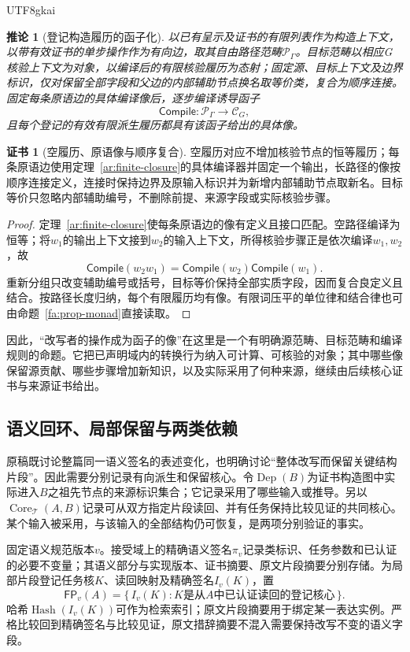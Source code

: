 \documentclass[11pt,a4paper]{article}
\theoremstyle{plain}
\newtheorem{corollary}[theorem]{推论}
\theoremstyle{definition}
\newtheorem*{certificate}{证书}
\theoremstyle{remark}
\begin{document}
\begin{CJK*}{UTF8}{gkai}
\begin{corollary}[登记构造履历的函子化]
\label{ar:functor}
以已有呈示及证书的有限列表作为构造上下文，以带有效证书的单步操作作为有向边，取其自由路径范畴$\mathcal P_\Gamma$。目标范畴以相应G核验上下文为对象，以编译后的有限核验履历为态射；固定源、目标上下文及边界标识，仅对保留全部字段和父边的内部辅助节点换名取等价类，复合为顺序连接。固定每条原语边的具体编译像后，逐步编译诱导函子
\[
 \mathsf{Compile}:\mathcal P_\Gamma\longrightarrow\mathcal C_G,
\]
且每个登记的有效有限派生履历都具有该函子给出的具体像。
\end{corollary}
\begin{certificate}[空履历、原语像与顺序复合]
空履历对应不增加核验节点的恒等履历；每条原语边使用定理~\ref{ar:finite-closure}的具体编译器并固定一个输出，长路径的像按顺序连接定义，连接时保持边界及原输入标识并为新增内部辅助节点取新名。目标等价只忽略内部辅助编号，不删除前提、来源字段或实际核验步骤。
\end{certificate}
\begin{proof}
定理~\ref{ar:finite-closure}使每条原语边的像有定义且接口匹配。空路径编译为恒等；将$w_1$的输出上下文接到$w_2$的输入上下文，所得核验步骤正是依次编译$w_1,w_2$，故
\[
 \mathsf{Compile}(w_2w_1)
 =\mathsf{Compile}(w_2)\mathsf{Compile}(w_1).
\]
重新分组只改变辅助编号或括号，目标等价保持全部实质字段，因而复合良定义且结合。按路径长度归纳，每个有限履历均有像。有限词压平的单位律和结合律也可由命题~\ref{fa:prop-monad}直接读取。
\end{proof}

因此，“改写者的操作成为函子的像”在这里是一个有明确源范畴、目标范畴和编译规则的命题。它把已声明域内的转换行为纳入可计算、可核验的对象；其中哪些像保留源贡献、哪些步骤增加新知识，以及实际采用了何种来源，继续由后续核心证书与来源证书给出。



\subsection{语义回环、局部保留与两类依赖}
\label{ar:local-core}

原稿既讨论整篇同一语义签名的表述变化，也明确讨论“整体改写而保留关键结构片段”\cite{S12}。因此需要分别记录有向派生和保留核心。令$\operatorname{Dep}(B)$为证书构造图中实际进入$B$之祖先节点的来源标识集合；它记录采用了哪些输入或推导。另以$\operatorname{Core}_{\mathcal T}(A,B)$记录可从双方指定片段读回、并有任务保持比较见证的共同核心。某个输入被采用，与该输入的全部结构仍可恢复，是两项分别验证的事实。

固定语义规范版本$v$。接受域上的精确语义签名$\pi_v$记录类标识、任务参数和已认证的必要不变量；其语义部分与实现版本、证书摘要、原文片段摘要分别存储。为局部片段登记任务核$K$、读回映射及精确签名$I_v(K)$，置
\[
 \mathsf{FP}_v(A)
 =\{\,I_v(K):K\text{是从}A\text{中已认证读回的登记核心}\,\}.
\]
哈希$\operatorname{Hash}(I_v(K))$可作为检索索引；原文片段摘要用于绑定某一表达实例。严格比较回到精确签名与比较见证，原文措辞摘要不混入需要保持改写不变的语义字段。


\end{CJK*}
\end{document}
